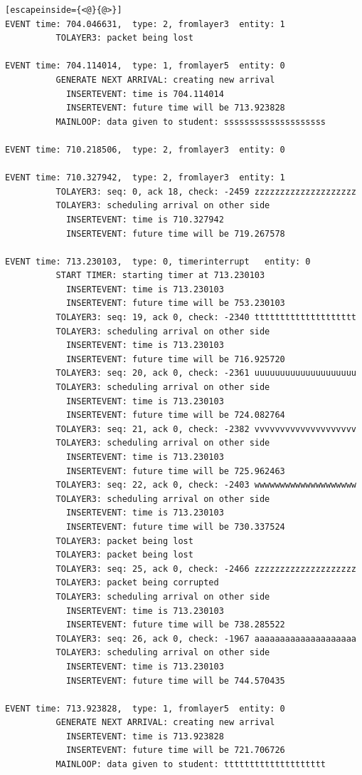 \documentclass[paper=a4, fontsize=11pt]{scrartcl}
\numberwithin{equation}{section}		%
\numberwithin{figure}{section}			%
\numberwithin{table}{section}				%
\begin{document}
\begin{lstlisting}[escapeinside={<@}{@>}]
EVENT time: 704.046631,  type: 2, fromlayer3  entity: 1
          TOLAYER3: packet being lost

EVENT time: 704.114014,  type: 1, fromlayer5  entity: 0
          GENERATE NEXT ARRIVAL: creating new arrival
            INSERTEVENT: time is 704.114014
            INSERTEVENT: future time will be 713.923828
          MAINLOOP: data given to student: ssssssssssssssssssss

EVENT time: 710.218506,  type: 2, fromlayer3  entity: 0

EVENT time: 710.327942,  type: 2, fromlayer3  entity: 1
          TOLAYER3: seq: 0, ack 18, check: -2459 zzzzzzzzzzzzzzzzzzzz
          TOLAYER3: scheduling arrival on other side
            INSERTEVENT: time is 710.327942
            INSERTEVENT: future time will be 719.267578

EVENT time: 713.230103,  type: 0, timerinterrupt   entity: 0
          START TIMER: starting timer at 713.230103
            INSERTEVENT: time is 713.230103
            INSERTEVENT: future time will be 753.230103
          TOLAYER3: seq: 19, ack 0, check: -2340 tttttttttttttttttttt
          TOLAYER3: scheduling arrival on other side
            INSERTEVENT: time is 713.230103
            INSERTEVENT: future time will be 716.925720
          TOLAYER3: seq: 20, ack 0, check: -2361 uuuuuuuuuuuuuuuuuuuu
          TOLAYER3: scheduling arrival on other side
            INSERTEVENT: time is 713.230103
            INSERTEVENT: future time will be 724.082764
          TOLAYER3: seq: 21, ack 0, check: -2382 vvvvvvvvvvvvvvvvvvvv
          TOLAYER3: scheduling arrival on other side
            INSERTEVENT: time is 713.230103
            INSERTEVENT: future time will be 725.962463
          TOLAYER3: seq: 22, ack 0, check: -2403 wwwwwwwwwwwwwwwwwwww
          TOLAYER3: scheduling arrival on other side
            INSERTEVENT: time is 713.230103
            INSERTEVENT: future time will be 730.337524
          TOLAYER3: packet being lost
          TOLAYER3: packet being lost
          TOLAYER3: seq: 25, ack 0, check: -2466 zzzzzzzzzzzzzzzzzzzz
          TOLAYER3: packet being corrupted
          TOLAYER3: scheduling arrival on other side
            INSERTEVENT: time is 713.230103
            INSERTEVENT: future time will be 738.285522
          TOLAYER3: seq: 26, ack 0, check: -1967 aaaaaaaaaaaaaaaaaaaa
          TOLAYER3: scheduling arrival on other side
            INSERTEVENT: time is 713.230103
            INSERTEVENT: future time will be 744.570435

EVENT time: 713.923828,  type: 1, fromlayer5  entity: 0
          GENERATE NEXT ARRIVAL: creating new arrival
            INSERTEVENT: time is 713.923828
            INSERTEVENT: future time will be 721.706726
          MAINLOOP: data given to student: tttttttttttttttttttt


\end{lstlisting}
\end{document}
